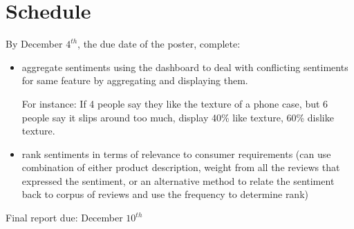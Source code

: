 \documentclass{article}
\begin{document}
\section{Schedule}

By December $4^{th}$, the due date of the poster, complete:
\begin{itemize}
\item aggregate sentiments using the dashboard to deal with conflicting sentiments for same feature by aggregating and displaying them. 

For instance: If 4 people say they like the texture of a phone case, but 6 people say it slips around too much, display 40\% like texture, 60\% dislike texture. 

\item 
rank sentiments in terms of relevance to consumer requirements (can use combination of either product description, weight from all the reviews that expressed the sentiment, or an alternative method to relate the sentiment back to corpus of reviews and use the frequency to determine rank)

\end{itemize}

Final report due: December $10^{th}$
\end{document}
